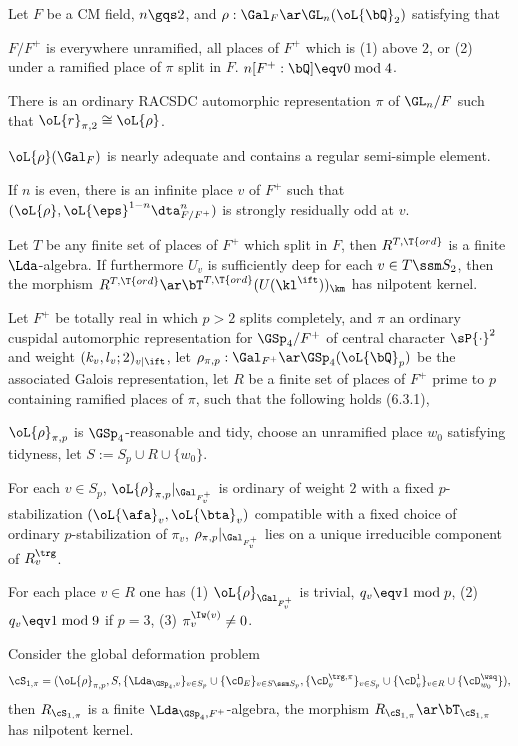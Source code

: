 \documentclass[article, a4paper, twoside]{universal}
\begin{document}
\begin{thm}\label{thm:p=2-R=T}
    Let $F$ be a CM field, $n\gqs2$, and $\rho:\Gal_{F}\ar\GL_{n}(\oL{\bQ}_{2})$ satisfying that
    \begin{itm}
        \item $F/F^{+}$ is everywhere unramified, all places of $F^{+}$ which is (1) above $2$, or (2) under a ramified place of $\pi$ split in $F$. $n[F^{+}:\bQ]\eqv0\bmod{4}$.
        \item There is an ordinary RACSDC automorphic representation $\pi$ of $\GL_{n}/F$ such that $\oL{r}_{\pi,2}\cong\oL{\rho}$.
        \item $\oL{\rho}(\Gal_{F})$ is nearly adequate and contains a regular semi-simple element.
        \item If $n$ is even, there is an infinite place $v$ of $F^{+}$ such that $(\oL{\rho},\oL{\eps}^{1-n}\dta_{F/F^{+}}^{n})$ is strongly residually odd at $v$.
    \end{itm}
    Let $T$ be any finite set of places of $F^{+}$ which split in $F$, then $R^{T,\T{ord}}$ is a finite $\Lda$-algebra. If furthermore $U_{v}$ is sufficiently deep for each $v\in T\ssm S_{2}$, then the morphism $R^{T,\T{ord}}\ar\bT^{T,\T{ord}}(U(\kl^{\ift}))_{\km}$ has nilpotent kernel.
\end{thm}

\begin{thm}\label{thm:p>2-R=T}
    Let $F^{+}$ be totally real in which $p>2$ splits completely, and $\pi$ an ordinary cuspidal automorphic representation for $\GSp_{4}/F^{+}$ of central character $\sP{\cdot}^{2}$ and weight $(k_{v},l_{v};2)_{v\mid\ift}$, let $\rho_{\pi,p}:\Gal_{F^{+}}\ar\GSp_{4}(\oL{\bQ}_{p})$ be the associated Galois representation, let $R$ be a finite set of places of $F^{+}$ prime to $p$ containing ramified places of $\pi$, such that the following holds (6.3.1),
    \begin{itm}
        \item $\oL{\rho}_{\pi,p}$ is $\GSp_{4}$-reasonable and tidy, choose an unramified place $w_{0}$ satisfying tidyness, let $S:=S_{p}\cup R\cup \{w_{0}\}$.
        \item For each $v\in S_{p}$, $\oL{\rho}_{\pi,p}|_{\Gal_{F_{v}^{+}}}$ is ordinary of weight $2$ with a fixed $p$-stabilization $(\oL{\afa}_{v},\oL{\bta}_{v})$ compatible with a fixed choice of ordinary $p$-stabilization of $\pi_{v}$, $\rho_{\pi,p}|_{\Gal_{F_{v}^{+}}}$ lies on a unique irreducible component of $R_{v}^{\trg}$.
        \item For each place $v\in R$ one has (1) $\oL{\rho}_{\Gal_{F_{v}^{+}}}$ is trivial, $q_{v}\eqv1\bmod{p}$, (2) $q_{v}\eqv1\bmod{9}$ if $p=3$, (3) $\pi_{v}^{\Iw(v)}\neq0$.
    \end{itm}
    Consider the global deformation problem
    \[
        \cS_{1,\pi}=(\oL{\rho}_{\pi,p},S,\{\Lda_{\GSp_{4},v}\}_{v\in S_{p}}\cup\{\cO_{E}\}_{v\in S\ssm S_{p}},\{\cD_{v}^{\trg,\pi}\}_{v\in S_{p}}\cup\{\cD_{v}^{1}\}_{v\in R}\cup\{\cD_{w_{0}}^{\wsq}\}),
    \]
    then $R_{\cS_{1,\pi}}$ is a finite $\Lda_{\GSp_{4},F^{+}}$-algebra, the morphism $R_{\cS_{1,\pi}}\ar\bT_{\cS_{1,\pi}}$ has nilpotent kernel.
\end{thm}
\end{document}
